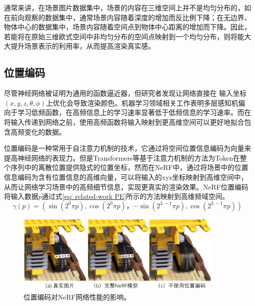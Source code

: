 通常来讲，在场景图片数据集中，场景的内容在三维空间上并不是均匀分布的，如在前向观察的数据集中，通常场景内容随着深度的增加而反比例下降；在无边界、物体中心的数据集中，场景内容随着空间点到物体中心距离的增加而下降。因此，若能将在原始三维欧式空间中非均匀分布的空间点映射到一个均匀分布，则将能大大提升场景表示的利用率，从而提高渲染真实感。

\subsection{位置编码}
\label{sec: related-work positional encoding}

尽管神经网络被证明为通用的函数逼近器\cite{hornik_multilayer_1989}，但研究者发现让网络直接在 输入坐标$(x,y,z,\theta,\phi)$上优化会导致渲染颜色。机器学习领域相关工作\cite{rahaman_spectral_2019}表明多层感知机偏向于学习低频函数，在高频信息上的学习速率显著低于低频信息的学习速率。而在将输入传递到网络之前，使用高频函数将输入映射到更高维空间可以更好地拟合包含高频变化的数据。

位置编码是一种常用于自注意力机制的技术，它通过将空间位置信息编码为向量来提高神经网络的表现力。但是Transformers\cite{vaswani_attention_2017}等基于注意力机制的方法为Token在整个序列中的离散位置提供隐式的位置坐标，然而在NeRF\cite{mildenhall_nerf_2020}中，通过将场景中的位置信息编码为含有位置信息的高维向量，可以将输入的xyz坐标映射到高维空间中，从而让网络学习场景中的高频细节信息，实现更真实的渲染效果。NeRF位置编码将输入数据$p$通过式\ref{eq: related-work PE}所示的方法映射到高维频域空间。
\begin{equation}
    \gamma(p) = \left(\sin(2^0\pi p),\cos(2^0\pi p)，\cdots \sin(2^{L-1}\pi p),\cos(2^{L-1}\pi p)\right)
    \label{eq: related-work PE}
\end{equation}

\begin{figure}[ht]
    \centering
    \includegraphics[width=0.9\textwidth]{undergraduate-thesis/images/related-work/NeRF ablation-PE.pdf}
    \caption{位置编码对NeRF网络性能的影响\cite{mildenhall_nerf_2020}。}
    \label{fig:related-work nerf-PE-ablation}
\end{figure}

